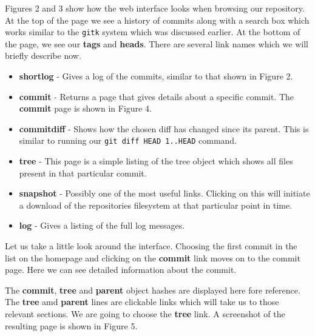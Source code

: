 

Figures 2 and 3 show how the web interface looks when browsing our repository.
At the top of the page we see a history of commits along with a search box which works similar to the \texttt{gitk} system which was discussed earlier.
At the bottom of the page, we see our \textbf{tags} and \textbf{heads}.
There are several link names which we will briefly describe now.

\begin{itemize}
\item {}\textbf{shortlog} - Gives a log of the commits, similar to that shown in Figure 2.
\item {}\textbf{commit} - Returns a page that gives details about a specific commit.
The \textbf{commit} page is shown in Figure 4.
\item {}\textbf{commitdiff} - Shows how the chosen diff has changed since its parent.  
This is similar to running our \texttt{git diff HEAD~1..HEAD} command.
\item {}\textbf{tree} - This page is a simple listing of the tree object which shows all files present in that particular commit.
\item {}\textbf{snapshot} - Possibly one of the most useful links.
Clicking on this will initiate a download of the repositories filesystem at that particular point in time.
\item {}\textbf{log} - Gives a listing of the full log messages.
\end{itemize}

Let us take a little look around the interface.
Choosing the first commit in the list on the homepage and clicking on the \textbf{commit} link moves on to the commit page.
Here we can see detailed information about the commit.


The \textbf{commit}, \textbf{tree} and \textbf{parent} object hashes are displayed here fore reference.
The \textbf{tree} amd \textbf{parent} lines are clickable links which will take us to those relevant sections.
We are going to choose the \textbf{tree} link.
A screenshot of the resulting page is shown in Figure 5.

